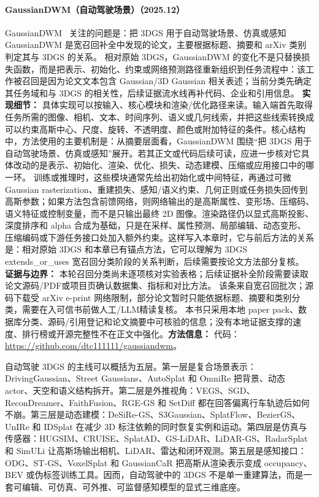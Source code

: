 \paragraph{GaussianDWM（自动驾驶场景）（2025.12）}
GaussianDWM~\cite{2512_23180} 关注的问题是：把 3DGS 用于自动驾驶场景、仿真或感知 GaussianDWM 是宽召回补全中发现的论文，主要根据标题、摘要和 arXiv 类别判定其与 3DGS 的关系。
相对原始 3DGS，GaussianDWM 的变化不是只替换损失函数，而是把表示、初始化、约束或网络预测路径重新组织到任务流程中：该工作被召回是因为论文文本包含 Gaussian/3D Gaussian 相关表述；当前分类先确定其任务域和与 3DGS 的相关性，后续证据流水线再补代码、企业和引用信息。
\textbf{实现细节：} 具体实现可以按输入、核心模块和渲染/优化路径来读。输入端首先取得任务所需的图像、相机、文本、时间序列、语义或几何线索，并把这些线索转换成可以约束高斯中心、尺度、旋转、不透明度、颜色或附加特征的条件。核心结构中，方法使用的主要机制是：从摘要层面看，GaussianDWM 围绕“把 3DGS 用于自动驾驶场景、仿真或感知”展开。若其正文或代码后续可读，应进一步核对它具体改动的是表示、初始化、渲染、优化、损失、动态建模、压缩或应用接口中的哪一环。 训练或推理时，这些模块通常先给出初始化或中间特征，再通过可微 Gaussian rasterization、重建损失、感知/语义约束、几何正则或任务损失回传到高斯参数；如果方法包含前馈网络，则网络输出的是高斯属性、变形场、压缩码、语义特征或控制变量，而不是只输出最终 2D 图像。渲染路径仍以显式高斯投影、深度排序和 alpha 合成为基础，只是在采样、属性预测、局部编辑、动态变形、压缩编码或下游任务接口处加入额外约束。这样写入本章时，它与前后方法的关系是：相对原始 3DGS 和本章已有锚点方法，它可以理解为 3DGS extends\_or\_uses 宽召回分类阶段的关系判断，后续需要按论文方法部分复核。
\textbf{证据与边界：} 本轮召回分类尚未逐项核对实验表格；后续证据补全阶段需要读取论文源码/PDF或项目页确认数据集、指标和对比方法。 该条来自宽召回批次；源码下载受 arXiv e-print 网络限制，部分论文暂时只能依据标题、摘要和类别分类，需要在入可信书前做人工/LLM精读复核。 本书只采用本地 paper pack、数据库分类、源码/引用登记和论文摘要中可核验的信息；没有本地证据支撑的速度、排行榜或开源完整性不在正文中强化。\textbf{方法信息：} 代码：\url{https://github.com/dtc111111/gaussiandwm}。


自动驾驶 3DGS 的主线可以概括为五层。第一层是复合场景表示：DrivingGaussian、Street Gaussians、AutoSplat 和 OmniRe 把背景、动态 actor、天空和语义结构拆开。第二层是外推视角：VEGS、SGD、ReconDreamer、FaithFusion、RGE-GS 和 SetDiff 都在回答偏离行车轨迹后如何不崩。第三层是动态建模：DeSiRe-GS、S3Gaussian、SplatFlow、BezierGS、UnIRe 和 IDSplat 在减少 3D 标注依赖的同时恢复实例和运动。第四层是仿真与传感器：HUGSIM、CRUISE、SplatAD、GS-LiDAR、LiDAR-GS、RadarSplat 和 SimULi 让高斯场输出相机、LiDAR、雷达和闭环观测。第五层是感知接口：ODG、ST-GS、VoxelSplat 和 GaussianCaR 把高斯从渲染表示变成 occupancy、BEV 或伪标签训练工具。因而，自动驾驶中的 3DGS 不是单一重建算法，而是一套可编辑、可仿真、可外推、可监督感知模型的显式三维底座。

